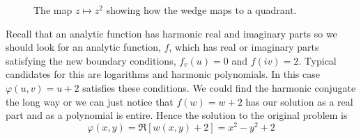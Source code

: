 \documentclass{article}
\begin{document}
\begin{example}
\begin{figure}[ht]
            \tikzexternaldisable
            \caption{The map \(z \mapsto z^2\) showing how the wedge maps to a quadrant.}
            \label{fig:conformal map bc example 1}
        \end{figure}
    
        Recall that an analytic function has harmonic real and imaginary parts so we should look for an analytic function, \(f\), which has real or imaginary parts satisfying the new boundary conditions, \(f_v(u) = 0\) and \(f(iv) = 2\).
        Typical candidates for this are logarithms and harmonic polynomials.
        In this case \(\varphi(u, v) = u + 2\) satisfies these conditions.
        We could find the harmonic conjugate the long way or we can just notice that \(f(w) = w + 2\) has our solution as a real part and as a polynomial is entire.
        Hence the solution to the original problem is
        \[\varphi(x, y) = \Re[w(x, y) + 2] = x^2 - y^2 + 2\]
    \end{example}
\end{document}

